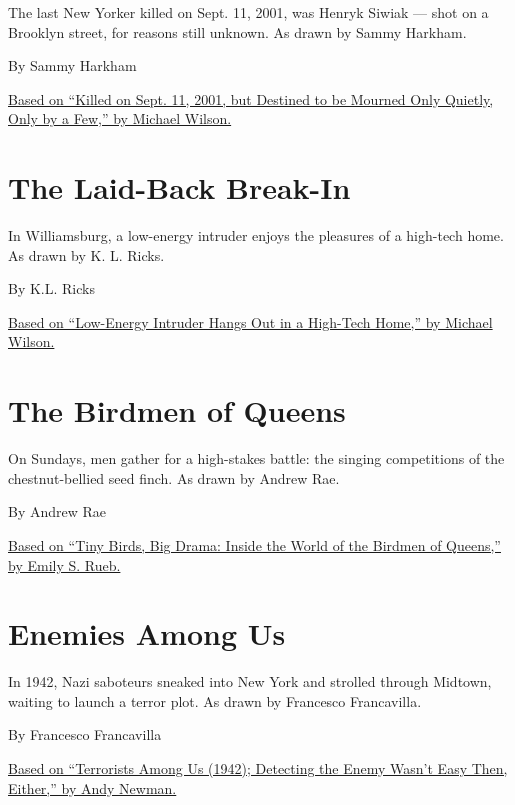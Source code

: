The last New Yorker killed on Sept. 11, 2001, was Henryk Siwiak --- shot
on a Brooklyn street, for reasons still unknown. As drawn by Sammy
Harkham.

By Sammy Harkham

\href{http://www.nytimes3xbfgragh.onion/2011/09/10/nyregion/brooklyn-murder-on-sept-11-2001-remains-unsolved.html}{Based
on ``Killed on Sept. 11, 2001, but Destined to be Mourned Only Quietly,
Only by a Few,'' by Michael Wilson.}

\hypertarget{the-laid-back-break-in}{%
\section{The Laid-Back Break-In}\label{the-laid-back-break-in}}

In Williamsburg, a low-energy intruder enjoys the pleasures of a
high-tech home. As drawn by K. L. Ricks.

By K.L. Ricks

\href{https://www.nytimes3xbfgragh.onion/2017/03/05/nyregion/intruder-brooklyn-apartment.html}{Based
on ``Low-Energy Intruder Hangs Out in a High-Tech Home,'' by Michael
Wilson.}

\hypertarget{the-birdmen-of-queens}{%
\section{The Birdmen of Queens}\label{the-birdmen-of-queens}}

On Sundays, men gather for a high-stakes battle: the singing
competitions of the chestnut-bellied seed finch. As drawn by Andrew Rae.

By Andrew Rae

\href{https://www.nytimes3xbfgragh.onion/2015/08/02/nyregion/tiny-birds-big-drama-inside-the-world-of-the-birdmen-of-queens.html}{Based
on ``Tiny Birds, Big Drama: Inside the World of the Birdmen of Queens,''
by Emily S. Rueb.}

\hypertarget{enemies-among-us}{%
\section{Enemies Among Us}\label{enemies-among-us}}

In 1942, Nazi saboteurs sneaked into New York and strolled through
Midtown, waiting to launch a terror plot. As drawn by Francesco
Francavilla.

By Francesco Francavilla

\href{http://www.nytimes3xbfgragh.onion/2002/01/17/nyregion/terrorists-among-us-1942-detecting-the-enemy-wasn-t-easy-then-either.html}{Based
on ``Terrorists Among Us (1942); Detecting the Enemy Wasn't Easy Then,
Either,'' by Andy Newman.}

